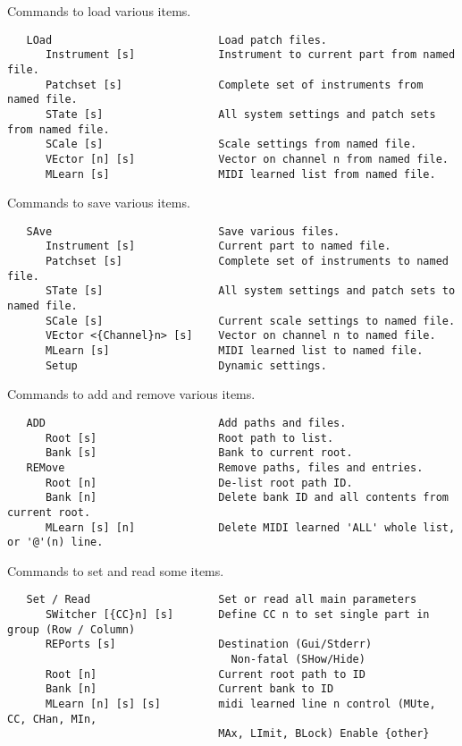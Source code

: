    Commands to load various items.

\begin{verbatim}
   LOad                          Load patch files.
      Instrument [s]             Instrument to current part from named file.
      Patchset [s]               Complete set of instruments from named file.
      STate [s]                  All system settings and patch sets from named file.
      SCale [s]                  Scale settings from named file.
      VEctor [n] [s]             Vector on channel n from named file.
      MLearn [s]                 MIDI learned list from named file.
\end{verbatim}

   Commands to save various items.

\begin{verbatim}
   SAve                          Save various files.
      Instrument [s]             Current part to named file.
      Patchset [s]               Complete set of instruments to named file.
      STate [s]                  All system settings and patch sets to named file.
      SCale [s]                  Current scale settings to named file.
      VEctor <{Channel}n> [s]    Vector on channel n to named file.
      MLearn [s]                 MIDI learned list to named file.
      Setup                      Dynamic settings.
\end{verbatim}

   Commands to add and remove various items.

\begin{verbatim}
   ADD                           Add paths and files.
      Root [s]                   Root path to list.
      Bank [s]                   Bank to current root.
   REMove                        Remove paths, files and entries.
      Root [n]                   De-list root path ID.
      Bank [n]                   Delete bank ID and all contents from current root.
      MLearn [s] [n]             Delete MIDI learned 'ALL' whole list, or '@'(n) line.
\end{verbatim}

   Commands to set and read some items.

\begin{verbatim}
   Set / Read                    Set or read all main parameters
      SWitcher [{CC}n] [s]       Define CC n to set single part in group (Row / Column)
      REPorts [s]                Destination (Gui/Stderr)
                                   Non-fatal (SHow/Hide)
      Root [n]                   Current root path to ID
      Bank [n]                   Current bank to ID
      MLearn [n] [s] [s]         midi learned line n control (MUte, CC, CHan, MIn,
                                 MAx, LImit, BLock) Enable {other}
\end{verbatim}

